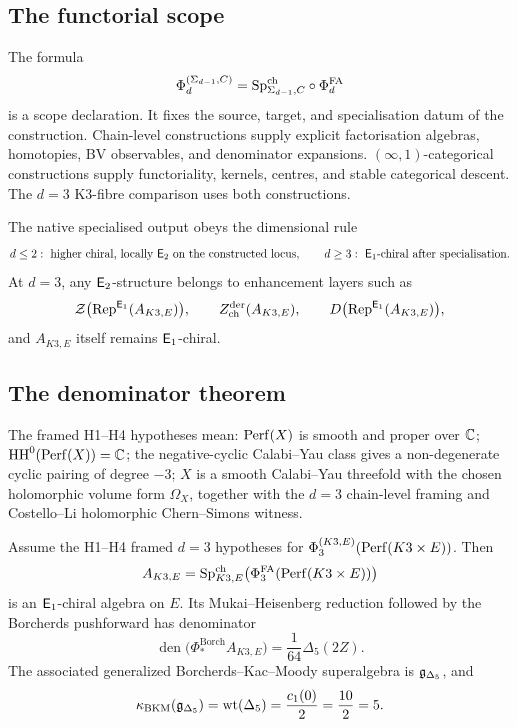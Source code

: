 \subsection*{The functorial scope}

The formula
\[
  \Phi_d^{(\Sigma_{d-1},C)}
  =
  \mathrm{Sp}^{\mathrm{ch}}_{\Sigma_{d-1},C}\circ\Phi^{\mathrm{FA}}_d
\]
is a scope declaration.  It fixes the source, target, and
specialisation datum of the construction.  Chain-level constructions
supply explicit factorisation algebras, homotopies, BV observables, and
denominator expansions.  \((\infty,1)\)-categorical constructions
supply functoriality, kernels, centres, and stable categorical descent.
The \(d=3\) K3-fibre comparison uses both constructions.

The native specialised output obeys the dimensional rule
\[
  d\leq 2:\ \text{higher chiral, locally \(\mathsf{E}_2\) on the constructed locus},
  \qquad
  d\geq 3:\ \text{\(\mathsf{E}_1\)-chiral after specialisation}.
\]
At \(d=3\), any \(\mathsf{E}_2\)-structure belongs to enhancement layers such
as
\[
  \mathcal{Z}\bigl(\mathrm{Rep}^{\mathsf{E}_1}(A_{K3,E})\bigr),\qquad
  Z_{\mathrm{ch}}^{\mathrm{der}}(A_{K3,E}),\qquad
  D\bigl(\mathrm{Rep}^{\mathsf{E}_1}(A_{K3,E})\bigr),
\]
and \(A_{K3,E}\) itself remains \(\mathsf{E}_1\)-chiral.

\subsection*{The denominator theorem}

The framed H1--H4 hypotheses mean: \(\mathrm{Perf}(X)\) is smooth and proper
over \(\mathbb C\); \(\mathrm{HH}^0(\mathrm{Perf}(X))=\mathbb C\); the negative-cyclic
Calabi--Yau class gives a non-degenerate cyclic pairing of degree
\(-3\); \(X\) is a smooth Calabi--Yau threefold with the chosen
holomorphic volume form \(\Omega_X\), together with the \(d=3\)
chain-level framing and Costello--Li holomorphic Chern--Simons witness.

\begin{theorem}
\label{thm:lorgat-k3e-denominator}
Assume the H1--H4 framed \(d=3\) hypotheses for
\(\Phi_3^{(K3,E)}(\mathrm{Perf}(K3\times E))\).  Then
\[
  A_{K3,E}
  =
  \mathrm{Sp}^{\mathrm{ch}}_{K3,E}\bigl(\Phi^{\mathrm{FA}}_3(\mathrm{Perf}(K3\times E))\bigr)
\]
is an \(\mathsf{E}_1\)-chiral algebra on \(E\).  Its
Mukai--Heisenberg reduction followed by the Borcherds pushforward has
denominator
\[
  \operatorname{den}\bigl(\Phi^{\mathrm{Borch}}_* A_{K3,E}\bigr)
  =
  \frac{1}{64}\Delta_5(2Z).
\]
The associated generalized Borcherds--Kac--Moody superalgebra is
\(\mathfrak{g}_{\Delta_5}\), and
\[
  \kappa_{\mathrm{BKM}}(\mathfrak{g}_{\Delta_5})
  =
  \mathrm{wt}(\Delta_5)
  =
  \frac{c_1(0)}{2}
  =
  \frac{10}{2}
  =
  5.
\]
\end{theorem}

